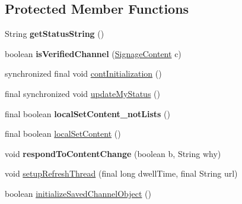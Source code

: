\subsection*{Protected Member Functions}
\begin{DoxyCompactItemize}
\item 
\hypertarget{classgov_1_1fnal_1_1ppd_1_1dd_1_1display_1_1client_1_1DisplayControllerMessagingAbstract_a2b1a875e536e8a8cdd816ce270809886}{String {\bfseries get\-Status\-String} ()}\label{classgov_1_1fnal_1_1ppd_1_1dd_1_1display_1_1client_1_1DisplayControllerMessagingAbstract_a2b1a875e536e8a8cdd816ce270809886}

\item 
\hypertarget{classgov_1_1fnal_1_1ppd_1_1dd_1_1display_1_1client_1_1DisplayControllerMessagingAbstract_ad57efd600c98eb1c295d3cd6fe095ad4}{boolean {\bfseries is\-Verified\-Channel} (\hyperlink{interfacegov_1_1fnal_1_1ppd_1_1dd_1_1signage_1_1SignageContent}{Signage\-Content} c)}\label{classgov_1_1fnal_1_1ppd_1_1dd_1_1display_1_1client_1_1DisplayControllerMessagingAbstract_ad57efd600c98eb1c295d3cd6fe095ad4}

\item 
synchronized final void \hyperlink{classgov_1_1fnal_1_1ppd_1_1dd_1_1display_1_1client_1_1DisplayControllerMessagingAbstract_a84ca1aeefd401a7d400e3bff94663830}{cont\-Initialization} ()
\item 
final synchronized void \hyperlink{classgov_1_1fnal_1_1ppd_1_1dd_1_1display_1_1client_1_1DisplayControllerMessagingAbstract_affb454bd94fc49410c790fece9c6cc52}{update\-My\-Status} ()
\item 
\hypertarget{classgov_1_1fnal_1_1ppd_1_1dd_1_1display_1_1client_1_1DisplayControllerMessagingAbstract_aabdab65eeec3892b41b7fc4d188838e8}{final boolean {\bfseries local\-Set\-Content\-\_\-not\-Lists} ()}\label{classgov_1_1fnal_1_1ppd_1_1dd_1_1display_1_1client_1_1DisplayControllerMessagingAbstract_aabdab65eeec3892b41b7fc4d188838e8}

\item 
final boolean \hyperlink{classgov_1_1fnal_1_1ppd_1_1dd_1_1display_1_1client_1_1DisplayControllerMessagingAbstract_a24673e152db1bddd9927cbc266059b99}{local\-Set\-Content} ()
\item 
\hypertarget{classgov_1_1fnal_1_1ppd_1_1dd_1_1display_1_1client_1_1DisplayControllerMessagingAbstract_a00e51f2f72500d05345037e5f780dbda}{void {\bfseries respond\-To\-Content\-Change} (boolean b, String why)}\label{classgov_1_1fnal_1_1ppd_1_1dd_1_1display_1_1client_1_1DisplayControllerMessagingAbstract_a00e51f2f72500d05345037e5f780dbda}

\item 
void \hyperlink{classgov_1_1fnal_1_1ppd_1_1dd_1_1display_1_1client_1_1DisplayControllerMessagingAbstract_a29b0a1677df18d26fdc7c5efb123baa5}{setup\-Refresh\-Thread} (final long dwell\-Time, final String url)
\item 
boolean \hyperlink{classgov_1_1fnal_1_1ppd_1_1dd_1_1display_1_1client_1_1DisplayControllerMessagingAbstract_add2c82077c4f12238773e4dfb2fd54aa}{initialize\-Saved\-Channel\-Object} ()
\end{DoxyCompactItemize}
